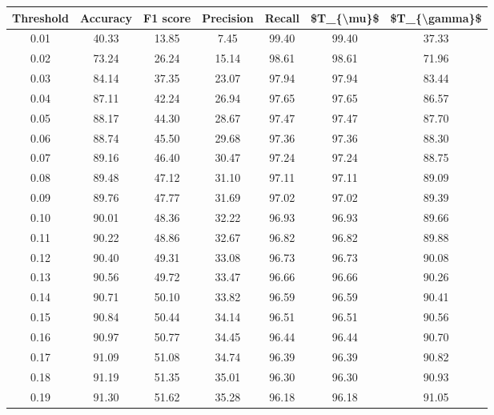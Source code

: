 \begin{tabular}{|c|c|c|c|c|c|c|}
\toprule
 Threshold &  Accuracy &  F1 score &  Precision &  Recall &  \$T\_\{\textbackslash mu\}\$ &  \$T\_\{\textbackslash gamma\}\$ \\
\hline
      0.01 &     40.33 &     13.85 &       7.45 &   99.40 &      99.40 &         37.33 \\
      0.02 &     73.24 &     26.24 &      15.14 &   98.61 &      98.61 &         71.96 \\
      0.03 &     84.14 &     37.35 &      23.07 &   97.94 &      97.94 &         83.44 \\
      0.04 &     87.11 &     42.24 &      26.94 &   97.65 &      97.65 &         86.57 \\
      0.05 &     88.17 &     44.30 &      28.67 &   97.47 &      97.47 &         87.70 \\
      0.06 &     88.74 &     45.50 &      29.68 &   97.36 &      97.36 &         88.30 \\
      0.07 &     89.16 &     46.40 &      30.47 &   97.24 &      97.24 &         88.75 \\
      0.08 &     89.48 &     47.12 &      31.10 &   97.11 &      97.11 &         89.09 \\
      0.09 &     89.76 &     47.77 &      31.69 &   97.02 &      97.02 &         89.39 \\
      0.10 &     90.01 &     48.36 &      32.22 &   96.93 &      96.93 &         89.66 \\
      0.11 &     90.22 &     48.86 &      32.67 &   96.82 &      96.82 &         89.88 \\
      0.12 &     90.40 &     49.31 &      33.08 &   96.73 &      96.73 &         90.08 \\
      0.13 &     90.56 &     49.72 &      33.47 &   96.66 &      96.66 &         90.26 \\
      0.14 &     90.71 &     50.10 &      33.82 &   96.59 &      96.59 &         90.41 \\
      0.15 &     90.84 &     50.44 &      34.14 &   96.51 &      96.51 &         90.56 \\
      0.16 &     90.97 &     50.77 &      34.45 &   96.44 &      96.44 &         90.70 \\
      0.17 &     91.09 &     51.08 &      34.74 &   96.39 &      96.39 &         90.82 \\
      0.18 &     91.19 &     51.35 &      35.01 &   96.30 &      96.30 &         90.93 \\
      0.19 &     91.30 &     51.62 &      35.28 &   96.18 &      96.18 &         91.05 \\

\end{tabular}
